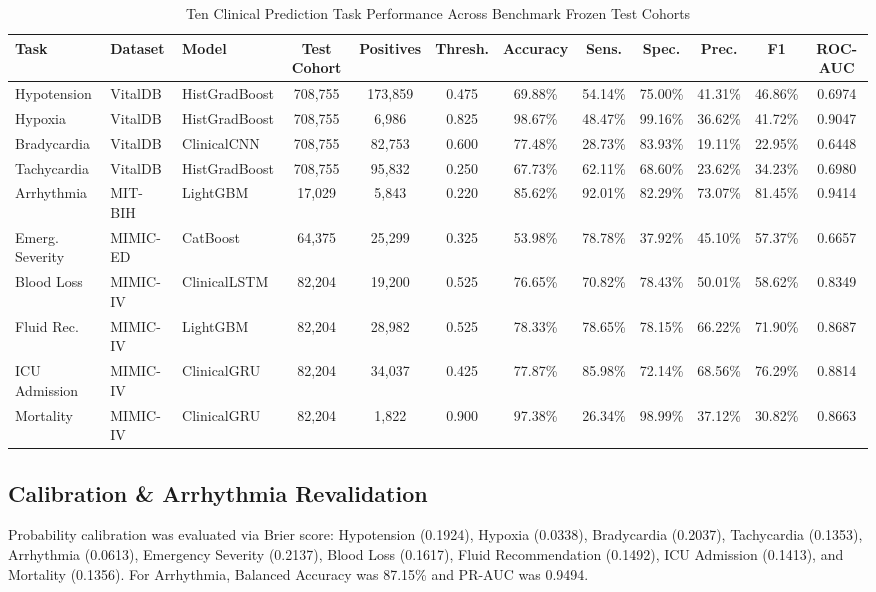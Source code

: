\documentclass[conference]{IEEEtran}
\begin{document}
\begin{table}[t]
\centering
\caption{Ten Clinical Prediction Task Performance Across Benchmark Frozen Test Cohorts}
\label{tab:results}
\begin{tabularx}{\textwidth}{l l l c c c c c c c c c}
\toprule
\textbf{Task} & \textbf{Dataset} & \textbf{Model} & \textbf{Test Cohort} & \textbf{Positives} & \textbf{Thresh.} & \textbf{Accuracy} & \textbf{Sens.} & \textbf{Spec.} & \textbf{Prec.} & \textbf{F1} & \textbf{ROC-AUC} \\
\midrule
Hypotension & VitalDB & HistGradBoost & 708,755 & 173,859 & 0.475 & 69.88\% & 54.14\% & 75.00\% & 41.31\% & 46.86\% & 0.6974 \\
Hypoxia & VitalDB & HistGradBoost & 708,755 & 6,986 & 0.825 & 98.67\% & 48.47\% & 99.16\% & 36.62\% & 41.72\% & 0.9047 \\
Bradycardia & VitalDB & ClinicalCNN & 708,755 & 82,753 & 0.600 & 77.48\% & 28.73\% & 83.93\% & 19.11\% & 22.95\% & 0.6448 \\
Tachycardia & VitalDB & HistGradBoost & 708,755 & 95,832 & 0.250 & 67.73\% & 62.11\% & 68.60\% & 23.62\% & 34.23\% & 0.6980 \\
Arrhythmia & MIT-BIH & LightGBM & 17,029 & 5,843 & 0.220 & 85.62\% & 92.01\% & 82.29\% & 73.07\% & 81.45\% & 0.9414 \\
Emerg. Severity & MIMIC-ED & CatBoost & 64,375 & 25,299 & 0.325 & 53.98\% & 78.78\% & 37.92\% & 45.10\% & 57.37\% & 0.6657 \\
Blood Loss & MIMIC-IV & ClinicalLSTM & 82,204 & 19,200 & 0.525 & 76.65\% & 70.82\% & 78.43\% & 50.01\% & 58.62\% & 0.8349 \\
Fluid Rec. & MIMIC-IV & LightGBM & 82,204 & 28,982 & 0.525 & 78.33\% & 78.65\% & 78.15\% & 66.22\% & 71.90\% & 0.8687 \\
ICU Admission & MIMIC-IV & ClinicalGRU & 82,204 & 34,037 & 0.425 & 77.87\% & 85.98\% & 72.14\% & 68.56\% & 76.29\% & 0.8814 \\
Mortality & MIMIC-IV & ClinicalGRU & 82,204 & 1,822 & 0.900 & 97.38\% & 26.34\% & 98.99\% & 37.12\% & 30.82\% & 0.8663 \\
\bottomrule
\end{tabularx}
\end{table}

\subsection{Calibration \& Arrhythmia Revalidation}
Probability calibration was evaluated via Brier score: Hypotension (0.1924), Hypoxia (0.0338), Bradycardia (0.2037), Tachycardia (0.1353), Arrhythmia (0.0613), Emergency Severity (0.2137), Blood Loss (0.1617), Fluid Recommendation (0.1492), ICU Admission (0.1413), and Mortality (0.1356). For Arrhythmia, Balanced Accuracy was 87.15\% and PR-AUC was 0.9494.
\end{document}

